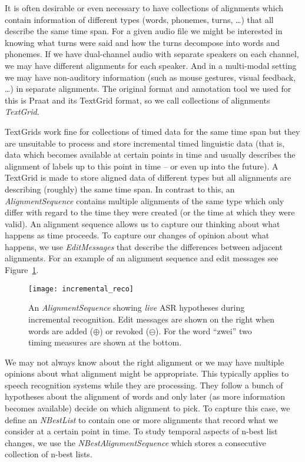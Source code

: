 \documentclass[a4,twoside=off,draft=true]{scrartcl}
\begin{document}
It is often desirable or even necessary to have collections of alignments which contain
information of different types (words, phonemes, turns, \ldots) that all describe the same
time span. For a given audio file we might be interested in knowing what turns were said
and how the turns decompose into words and phonemes. If we have dual-channel audio with separate
speakers on each channel, we may have different alignments for each speaker. And in a multi-modal
setting we may have non-auditory information (such as mouse gestures, visual feedback, \ldots) 
in separate alignments.
The original format and annotation tool we used for this is Praat and its TextGrid format,
so we call collections of alignments \emph{TextGrid}.

TextGrids work fine for collections of timed data for the same time span but
they are unsuitable to process and store incremental timed linguistic data (that is, data which
becomes available at certain points in time and usually describes the alignment of labels
up to this point in time -- or even up into the future). 
A TextGrid is made to store aligned data of different types but all alignments are 
describing (roughly) the same  time span.
In contrast to this, an \emph{AlignmentSequence} contains multiple alignments of the same type
which only differ with regard to the time they were created (or the time at which they were valid).
An alignment sequence allows us to capture our thinking about what happens as time proceeds. 
To capture our changes of opinion about what happens, we use \emph{EditMessages} that describe
the differences between adjacent alignments.
For an example of an alignment sequence and edit messages see Figure~\ref{fig:reco_example}.

\begin{figure}
\texttt{[image: incremental\_reco]}
\caption{\label{fig:reco_example}An \emph{AlignmentSequence} showing \emph{live} ASR hypotheses during incremental recognition.
Edit messages are shown on the right 
when words are added ($\oplus$) or revoked ($\ominus$).
For the word ``{\small\textsf{zwei}}'' two timing measures
are shown at the bottom.}
\end{figure}

We may not always know about the right alignment or we may have multiple opinions about
what alignment might be appropriate. This typically applies to speech recognition systems while
they are processing. They follow a bunch of hypotheses about the alignment of words and only later 
(as more information becomes available) decide on which alignment to pick. To capture this case, 
we define an \emph{NBestList} to contain one or more alignments that record what we consider
at a certain point in time. To study temporal aspects of n-best list changes,
we use the \emph{NBestAlignmentSequence} which stores a consecutive collection of n-best lists.
\end{document}
